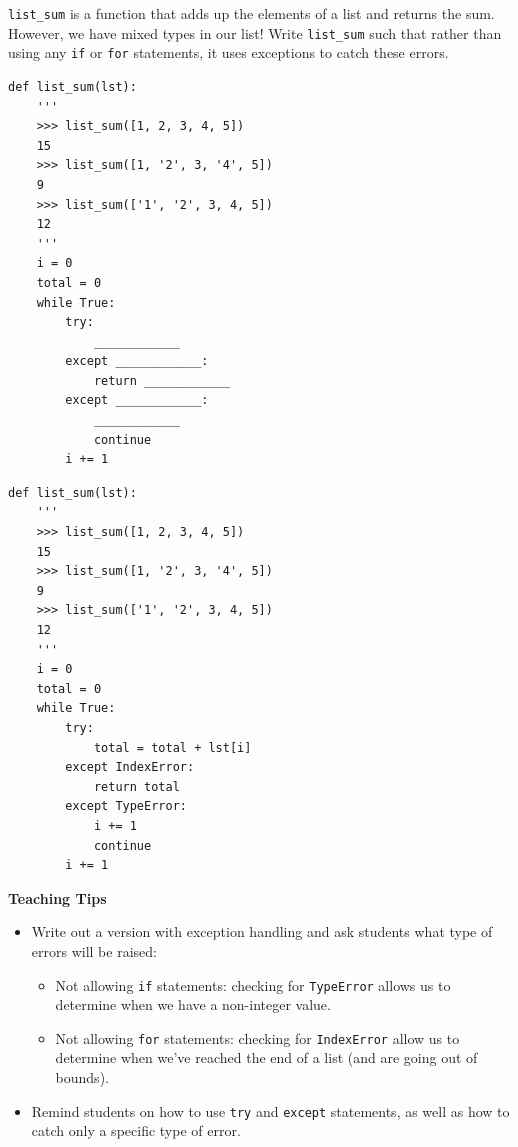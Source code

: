 \begin{blocksection}
\question \lstinline{list_sum} is a function that adds up the elements of a list and returns the sum. However, we have mixed types in our list! Write \lstinline{list_sum} such that rather than using any \lstinline{if} or \lstinline{for} statements, it uses exceptions to catch these errors.

\end{blocksection}

\ifprintanswers\else
\begin{lstlisting}
def list_sum(lst):
    '''
    >>> list_sum([1, 2, 3, 4, 5])
    15
    >>> list_sum([1, '2', 3, '4', 5])
    9
    >>> list_sum(['1', '2', 3, 4, 5])
    12
    '''
    i = 0
    total = 0
    while True:
        try:
            ____________
        except ____________:
            return ____________
        except ____________:
            ____________
            continue
        i += 1
\end{lstlisting}
\fi

\begin{solution}
\begin{blocksection}
\begin{lstlisting}
def list_sum(lst):
    '''
    >>> list_sum([1, 2, 3, 4, 5])
    15
    >>> list_sum([1, '2', 3, '4', 5])
    9
    >>> list_sum(['1', '2', 3, 4, 5])
    12
    '''
    i = 0
    total = 0
    while True:
        try:
            total = total + lst[i]
        except IndexError:
            return total
        except TypeError:
            i += 1
            continue
        i += 1
\end{lstlisting}
\end{blocksection}
\end{solution}

\begin{guide}
\begin{blocksection}
\textbf{Teaching Tips}
\begin{itemize}
    \item Write out a version with exception handling and ask students what type of errors will be raised:
    \begin{itemize}
        \item Not allowing \lstinline{if} statements: checking for \lstinline{TypeError} allows us to determine when we have a non-integer value.
        \item Not allowing \lstinline{for} statements: checking for \lstinline{IndexError} allow us to determine when we've reached the end of a list (and are going out of bounds). 
    \end{itemize}
    \item Remind students on how to use \lstinline{try} and \lstinline{except} statements, as well as how to catch only a specific type of error. 
    
\end{itemize}
\end{blocksection}
\end{guide}